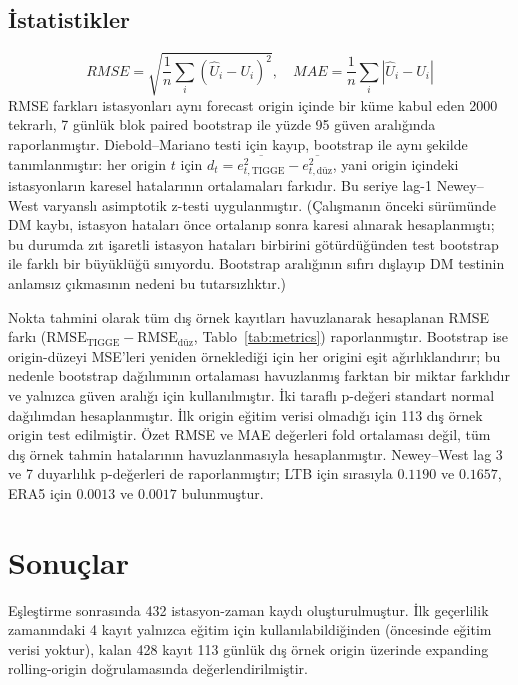 \documentclass[11pt,a4paper]{article}
\begin{document}
\subsection{İstatistikler}
\begin{equation}
RMSE=\sqrt{\frac{1}{n}\sum_i(\widehat{U}_i-U_i)^2},\quad
MAE=\frac{1}{n}\sum_i|\widehat{U}_i-U_i|
\end{equation}
RMSE farkları istasyonları aynı forecast origin içinde bir küme kabul eden 2000 tekrarlı, 7 günlük blok paired bootstrap ile yüzde 95 güven aralığında raporlanmıştır. Diebold--Mariano testi için kayıp, bootstrap ile aynı şekilde tanımlanmıştır: her origin $t$ için $d_t = \overline{e^2_{t,\mathrm{TIGGE}}} - \overline{e^2_{t,\mathrm{düz}}}$, yani origin içindeki istasyonların karesel hatalarının ortalamaları farkıdır. Bu seriye lag-1 Newey--West varyanslı asimptotik z-testi uygulanmıştır. (Çalışmanın önceki sürümünde DM kaybı, istasyon hataları önce ortalanıp sonra karesi alınarak hesaplanmıştı; bu durumda zıt işaretli istasyon hataları birbirini götürdüğünden test bootstrap ile farklı bir büyüklüğü sınıyordu. Bootstrap aralığının sıfırı dışlayıp DM testinin anlamsız çıkmasının nedeni bu tutarsızlıktır.)

Nokta tahmini olarak tüm dış örnek kayıtları havuzlanarak hesaplanan RMSE farkı ($\mathrm{RMSE}_{\mathrm{TIGGE}}-\mathrm{RMSE}_{\mathrm{düz}}$, Tablo~\ref{tab:metrics}) raporlanmıştır. Bootstrap ise origin-düzeyi MSE'leri yeniden örneklediği için her origini eşit ağırlıklandırır; bu nedenle bootstrap dağılımının ortalaması havuzlanmış farktan bir miktar farklıdır ve yalnızca güven aralığı için kullanılmıştır. İki taraflı p-değeri standart normal dağılımdan hesaplanmıştır. İlk origin eğitim verisi olmadığı için 113 dış örnek origin test edilmiştir. Özet RMSE ve MAE değerleri fold ortalaması değil, tüm dış örnek tahmin hatalarının havuzlanmasıyla hesaplanmıştır.
Newey--West lag 3 ve 7 duyarlılık p-değerleri de raporlanmıştır; LTB için
sırasıyla $0.1190$ ve $0.1657$, ERA5 için $0.0013$ ve $0.0017$ bulunmuştur.

\section{Sonuçlar}
Eşleştirme sonrasında 432 istasyon-zaman kaydı oluşturulmuştur. İlk geçerlilik
zamanındaki 4 kayıt yalnızca eğitim için kullanılabildiğinden (öncesinde eğitim
verisi yoktur), kalan 428 kayıt 113 günlük dış örnek origin üzerinde expanding
rolling-origin doğrulamasında değerlendirilmiştir.
\end{document}
